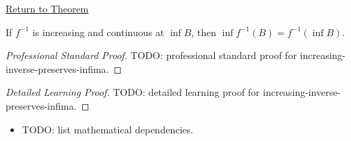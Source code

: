 \newpage
{}
\label{prf:increasing-inverse-preserves-infima}

\begin{remark*}[Return]
\hyperref[thm:increasing-inverse-preserves-infima]{Return to Theorem}
\end{remark*}

\begin{theorem*}
If $f^{-1}$ is increasing and continuous at $\inf B$, then
$\inf f^{-1}(B)=f^{-1}(\inf B)$.
\end{theorem*}

\begin{proof}[Professional Standard Proof]
\LRAProofBodyStart
TODO: professional standard proof for increasing-inverse-preserves-infima.
\end{proof}

\begin{proof}[Detailed Learning Proof]
\LRAProofBodyStart
TODO: detailed learning proof for increasing-inverse-preserves-infima.
\end{proof}

\begin{remark*}
\end{remark*}

\begin{dependencies}
\begin{itemize}
  \item TODO: list mathematical dependencies.
\end{itemize}
\end{dependencies}

\clearpage
